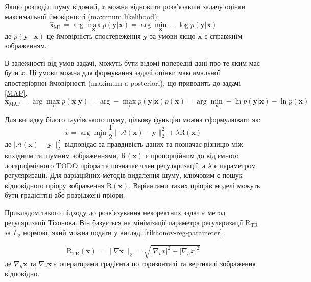 \documentclass[14pt,a4paper]{extarticle}
\newcounter{e}
\numberwithin{equation}{section}
\numberwithin{figure}{section}
\begin{document}
	Якщо розподіл шуму відомий, $x$ можна відновити розв'язавши задачу оцінки максимальної ймовірності (maximum likelihood):
	$$
	\hat{\boldsymbol{x}}_{\mathrm{ML}}
	= \arg \max_{\boldsymbol{x}} {p (\boldsymbol{y} | \boldsymbol{x})}
	= \arg \min_{\boldsymbol{x}} -\log p(\boldsymbol{y} | \boldsymbol{x})
	$$
	де $p(\boldsymbol{y} \mid \boldsymbol{x})$ це ймовірність спостереження $\boldsymbol{y}$ за умови якщо $\boldsymbol{x}$ є справжнім зображенням.
	
	В залежності від умов задачі, можуть бути відомі попередні дані про те яким має бути $x$. Ці умови можна для формування  задачі оцінки максимальної апостеріорної ймовірності (maximum a posteriori), що приводить до задачі \ref{MAP}.
	\begin{equation}
		\label{MAP}
		\hat{\boldsymbol{x}}_{\mathrm{MAP}}
		=
		\arg \max_{\boldsymbol{x}} p(\boldsymbol{x} | \boldsymbol{y}) 
		=
		\arg -\max_{\boldsymbol{x}} { p(\boldsymbol{y} | \boldsymbol{x})} p(\boldsymbol{x})
		=
		\arg \min_{\boldsymbol{x}} -\ln p(\boldsymbol{y} | \boldsymbol{x})-\ln p(\boldsymbol{x})
	\end{equation}
	
	Для випадку білого гаусівського шуму, цільову функцію можна сформулювати як:
	\begin{equation}
		\label{MAP-avgn}
		\hat{x}=\arg \min_{x} 	\frac{1}{2}\|\mathcal{A}(\boldsymbol{x})-\boldsymbol{y}\|_{2}^{2}+\lambda \mathrm{R}(\boldsymbol{x})
	\end{equation}
	де  $|\mathcal{A}(\boldsymbol{x})-\boldsymbol{y}\|_{2}^{2}$ відповідає за правдивість даних та позначає різницю між вихідним та шумним зображеннями, $\mathrm{R}(\boldsymbol{x})$ є пропорційним до від'ємного логарифмічного TODO пріора та позначає член регуляризації, а $\lambda$ є параметром регуляризації. Для варіаційних методів видалення шуму, ключовим є пошук відповідного пріору зображення $\mathrm{R}(\boldsymbol{x})$. Варіантами таких пріорів моделі можуть бути градієнтні або розріджені пріори.

	Прикладом такого підходу до розв'язування некоректних задач є метод регуляризації Тіхонова. Він базується на мінімізації параметра регуляризації $\mathrm{R}_{\mathrm{TR}}$ за $L_2$ нормою, який можна подати у вигляді \ref{tikhonov-reg-parameter}.
	
	\begin{equation}
		\label{tikhonov-reg-parameter}
		\mathrm{R}_{\mathrm{TR}}(\boldsymbol{x})
		=
		\|\nabla \boldsymbol{x}\|_{2} 
		=
		\sqrt{\left|\nabla_{v} x\right|^{2}+\left|\nabla_{h} x\right|^{2}}
	\end{equation}
	де $\nabla_{h} \boldsymbol{x}$ та $\nabla_{v} \boldsymbol{x}$ є операторами градієнта по горизонталі та вертикалі зображення відповідно.
	
\end{document}
